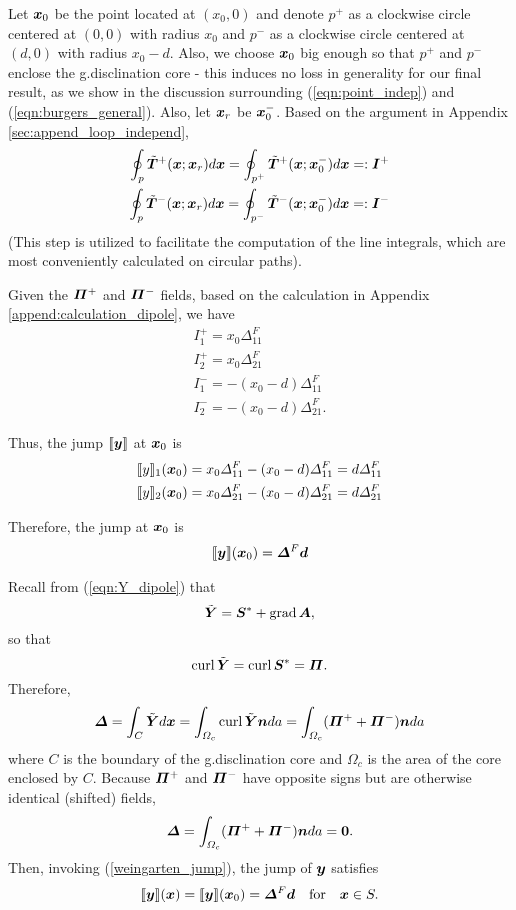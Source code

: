 \documentclass[11pt,letterpaper]{article}
\begin{document}
Let $\bfx_0$ be the point located at $(x_0,0)$ and denote $p^+$ as a clockwise circle centered at $(0,0)$ with radius $x_0$ and  $p^-$ as a clockwise circle centered at $(d,0)$ with radius $x_0-d$. Also, we choose $\bfx_0$  big enough so that $p^+$ and $p^-$ enclose the g.disclination core - this induces no loss in generality for our final result, as we show in the discussion surrounding (\ref{eqn:point_indep}) and (\ref{eqn:burgers_general}). Also, let $\bfx_r$ be $\bfx_0^-$. Based on the argument in Appendix \ref{sec:append_loop_independ}, 
\begin{eqnarray*}
 \oint_p \tilde{\bfT}^+(\bfx; \bfx_r) d\bfx = \oint_{p^+} \tilde{\bfT}^+(\bfx; \bfx_0^-) d\bfx =: \bfI^+\\
 \oint_p \tilde{\bfT}^-(\bfx; \bfx_r) d\bfx = \oint_{p^-} \tilde{\bfT}^-(\bfx; \bfx_0^-) d\bfx =: \bfI^-
\end{eqnarray*}
(This step is utilized to facilitate the computation of the line integrals, which are most conveniently calculated on circular paths).

Given the $\bfPi^+$ and $\bfPi^-$ fields, based on the calculation in Appendix \ref{append:calculation_dipole}, we have
\begin{eqnarray*}
I^+_1 =  x_0 \Delta^F_{11} \\
I^+_2 = x_0 \Delta^F_{21} \\
I^-_1 = -(x_0-d)\Delta^F_{11}\\
I^-_2 =  -(x_0-d) \Delta^F_{21}.
\end{eqnarray*}

Thus, the jump $\llbracket \bfy \rrbracket$ at $\bfx_0$ is
\begin{eqnarray*}
&\llbracket y \rrbracket_1 (\bfx_0) = x_0 \Delta^F_{11} -(x_0-d)\Delta^F_{11} = d\Delta^F_{11} \\
 &\llbracket y \rrbracket_2 (\bfx_0) = x_0 \Delta^F_{21} -(x_0-d) \Delta^F_{21} = d\Delta^F_{21}
\end{eqnarray*}

Therefore, the jump at $\bfx_0$ is 
\begin{eqnarray*}
\llbracket \bfy \rrbracket (\bfx_0) = \bfDelta^F \bfd
\end{eqnarray*}

Recall from (\ref{eqn:Y_dipole}) that
\[
\tilde{\bfY} = \bfS^{*} + \grad \bfA,
\]
so that
\[
\curl \tilde{\bfY} = \curl \bfS^{*} = \bfPi.
\]
Therefore, 
\[
\bfDelta =  \int_C \tilde{\bfY} d\bfx = \int_{\Omega_c} \curl \tilde{\bfY} \bfn da = \int_{\Omega_c} (\bfPi^+ + \bfPi^-) \bfn da
\]
where $C$ is the boundary of the g.disclination core and $\Omega_c$ is the area of the core enclosed by $C$. Because $\bfPi^+$ and $\bfPi^-$ have opposite signs but are otherwise identical (shifted) fields, 
\[
\bfDelta = \int_{\Omega_c} (\bfPi^+ + \bfPi^-) \bfn da = \bf0.
\]
Then, invoking (\ref{weingarten_jump}), the jump of $\bfy$ satisfies
\begin{equation}\label{eqn:point_indep}
\llbracket \bfy \rrbracket (\bfx) = \llbracket \bfy \rrbracket(\bfx_0) = \bfDelta^F \bfd\ \ \ \mbox{for} \ \ \ \bfx \in S.
\end{equation}
\end{document}
